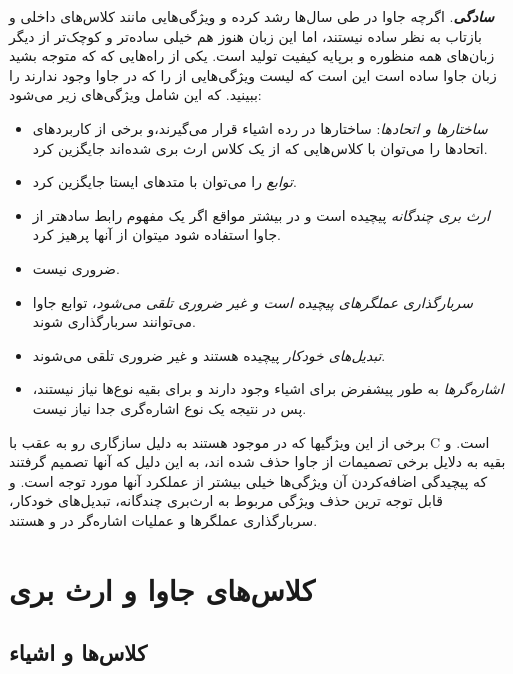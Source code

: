 \documentclass[a4paper,12pt]{report}
\begin{document}
	 \textbf{\textit{
	 سادگی}}. اگرچه جاوا در طی سال‌ها رشد کرده و ویژگی‌هایی مانند کلاس‌های داخلی و بازتاب به نظر ساده نیستند، اما این زبان هنوز هم خیلی ساده‌تر و کوچک‌تر از دیگر زبان‌های همه منظوره و برپایه کیفیت تولید است. یکی از راه‌هایی که که متوجه بشید زبان جاوا ساده است این است که لیست ویژگی‌هایی از 
 	را که در جاوا وجود ندارند را ببینید. که این شامل ویژگی‌های زیر می‌شود:
 	
	\begin{itemize}[nosep]
 		\renewcommand{\labelitemi}{\color{gray}\scriptsize$\blacksquare$}
 		\item 
 		\textit{
 		ساختار‌ها و اتحادها}: ساختارها در رده اشیاء قرار می‌گیرند،‌و برخی از کاربرد‌های اتحادها را می‌توان
 	 با کلاس‌هایی که از یک کلاس ارث بری شده‌اند جایگزین کرد.
 	
	 	\item 
	 	\textit{
	 	توابع} را می‌توان با متد‌های ایستا جایگزین کرد.
	 	\item 
	 	\textit{
	 	ارث بری چندگانه} پیچیده است و در بیشتر مواقع اگر یک مفهوم رابط سادهتر از جاوا استفاده شود میتوان از آنها پرهیز کرد.
	 	\item 
	 	\textit{
	 	}
 		ضروری نیست.
	 	\item 
	 	\textit{
	 	سربارگذاری عملگر‌های پیچیده است و غیر ضروری تلقی می‌شود}، توابع جاوا می‌توانند سربارگذاری شوند.
	 	\item 
	 	\textit{
	 	تبدیل‌های خودکار} پیچیده هستند و غیر ضروری تلقی می‌شوند.
	 	\item 
	 	\textit{
	 	اشاره‌گرها} به طور پیشفرض برای اشیاء وجود دارند و برای بقیه نوع‌ها نیاز نیستند، پس در نتیجه یک نوع اشاره‌گری جدا نیاز نیست.
 	\end{itemize}
 	
 	برخی از این ویژگیها که در 
 	موجود هستند به دلیل سازگاری رو به عقب با C  است. و بقیه به دلایل برخی تصمیمات از جاوا حذف شده اند، به این دلیل که آنها تصمیم گرفتند که پیچیدگی اضافه‌کردن آن ویژگی‌ها خیلی بیشتر از عملکرد آنها مورد توجه است. و قابل توجه ترین حذف ویژگی مربوط به ارث‌‌بری چندگانه،  تبدیل‌های خودکار، سربارگذاری عملگر‌ها و عملیات اشاره‌گر در 
 	 و 
 	هستند.
 	
 	\section{
 	کلاس‌های جاوا و ارث بری}
 	\label{sec2:chap13}
 	\subsection{
 	کلاس‌ها و اشیاء
 	}\label{subsec1:sec2:chap13}
 			
\end{document}
